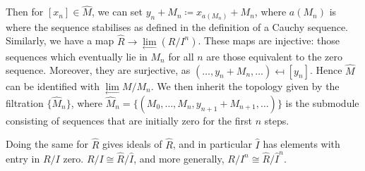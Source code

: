 \documentclass[10pt,a4paper]{article}
\begin{document}
Then for $[x_n] \in \hat{M}$, we can set $y_n +M_n \coloneqq x_{a(M_n)} + M_n$, where $a(M_n)$ is where the sequence stabilises as defined in the definition of a Cauchy sequence. Similarly, we have a map $\hat{R} \to \lim\limits_\leftarrow (R/I^n)$. These maps are injective: those sequences which eventually lie in $M_n$ for all $n$ are those equivalent to the zero sequence. Moreover, they are surjective, as $(\ldots, y_n+M_n, \ldots) \mapsfrom [y_n]$. Hence $\hat{M}$ can be identified with $\lim\limits_\leftarrow M/M_n$. We then inherit the topology given by the filtration $\{\hat{M}_n\}$, where $\hat{M}_n = \{(M_0, \ldots, M_n, y_{n+1}+M_{n+1}, \ldots)\}$ is the submodule consisting of sequences that are initially zero for the first $n$ steps.

Doing the same for $\hat{R}$ gives ideals of $\hat{R}$, and in particular $\hat{I}$ has elements with entry in $R/I$ zero. $R/I \cong \hat{R}/\hat{I}$, and more generally, $R/I^n \cong \hat{R}/\hat{I}^n$.
\end{document}
